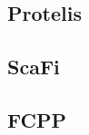 \subsection{Protelis}
\label{subsec:protelis}

\subsection{ScaFi}
\label{subsec:scafi}

\subsection{FCPP}
\label{subsec:fcpp}


%
%
%
%
%
